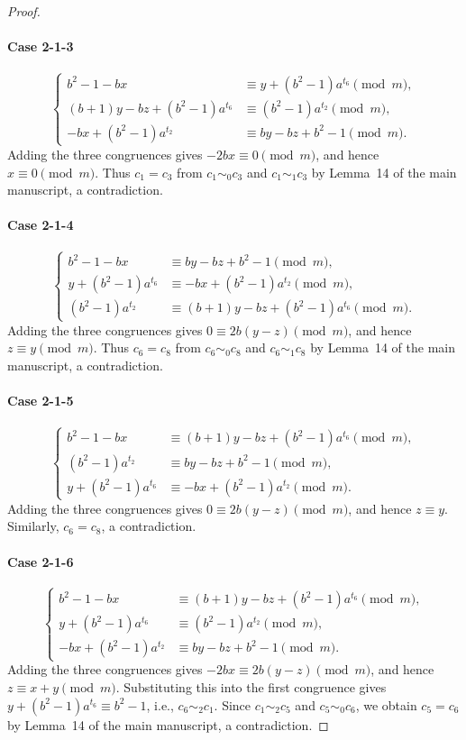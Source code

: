 \documentclass[11pt]{article}
\newcommand{\mymod}{\pmod{m}}
\begin{document}
\begin{proof}
\paragraph{Case 2-1-3}
$$
\begin{cases}
	b^2-1-bx &\equiv y+(b^2-1)a^{t_6}\mymod,\\
	(b+1)y-bz+(b^2-1)a^{t_6}&\equiv  (b^2-1)a^{t_2}\mymod,\\
	-bx+(b^2-1)a^{t_2} &\equiv by-bz+b^2-1\mymod.
\end{cases}
$$
Adding the three congruences gives $-2bx\equiv0\mymod$, and hence
$x\equiv0\mymod$. Thus $c_1=c_3$ from $c_1\sim_0 c_3$ and $c_1\sim_1 c_3$ by Lemma~14 of the main manuscript, a contradiction.

\paragraph{Case 2-1-4}
$$
\begin{cases}
	b^2-1-bx &\equiv by-bz+b^2-1\mymod, \\
	  y+(b^2-1)a^{t_6}&\equiv -bx+(b^2-1)a^{t_2}\mymod, \\
	(b^2-1)a^{t_2} &\equiv (b+1)y-bz+(b^2-1)a^{t_6}\mymod.
\end{cases}
$$
Adding the three congruences gives $0\equiv2b(y-z)\mymod$, and hence
$z\equiv y\mymod$. Thus $c_6=c_8$ from $c_6\sim_0 c_8$ and $c_6\sim_1 c_8$ by Lemma~14 of the main manuscript, a contradiction.

\paragraph{Case 2-1-5}
$$
\begin{cases}
	b^2-1-bx &\equiv (b+1)y-bz+(b^2-1)a^{t_6}\mymod, \\
	(b^2-1)a^{t_2} &\equiv by-bz+b^2-1\mymod, \\
	y+(b^2-1)a^{t_6} &\equiv -bx+(b^2-1)a^{t_2}\mymod.
\end{cases}
$$
Adding the three congruences gives $0\equiv2b(y-z)\mymod$, and hence
$z\equiv y$. Similarly, $c_6=c_8$, a contradiction.

\paragraph{Case 2-1-6}
$$
\begin{cases}
	b^2-1-bx &\equiv (b+1)y-bz+(b^2-1)a^{t_6}\mymod, \\
	y+(b^2-1)a^{t_6} &\equiv (b^2-1)a^{t_2}\mymod,\\
	-bx+(b^2-1)a^{t_2} &\equiv by-bz+b^2-1\mymod.
\end{cases}
$$
Adding the three congruences gives $-2bx\equiv2b(y-z)\mymod$, and hence $z\equiv x+y\mymod$. Substituting this into the first congruence gives 
$y+(b^2-1)a^{t_6}\equiv b^2-1$, i.e., $c_6\sim_2 c_1$.
Since $c_1\sim_2 c_5$ and $c_5\sim_0 c_6$, we obtain $c_5=c_6$ by Lemma~14 of the main manuscript, a contradiction.


\end{proof}
\end{document}

